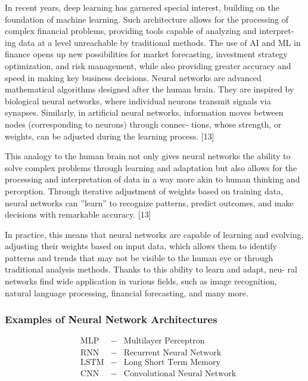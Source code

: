 \documentclass{article}
\begin{document}
\begin{flushleft}
\begin{justify}
In recent years, deep learning has garnered special interest, building on the
foundation of machine learning. Such architecture allows for the processing of
complex financial problems, providing tools capable of analyzing and interpret-
ing data at a level unreachable by traditional methods. The use of AI and ML
in finance opens up new possibilities for market forecasting, investment strategy
optimization, and risk management, while also providing greater accuracy and
speed in making key business decisions. Neural networks are advanced mathematical algorithms designed after the
human brain. They are inspired by biological neural networks, where individual
neurons transmit signals via synapses. Similarly, in artificial neural networks,
information moves between nodes (corresponding to neurons) through connec-
tions, whose strength, or weights, can be adjusted during the learning process.
[13]

This analogy to the human brain not only gives neural networks the ability
to solve complex problems through learning and adaptation but also allows for
the processing and interpretation of data in a way more akin to human thinking
and perception. Through iterative adjustment of weights based on training data,
neural networks can ”learn” to recognize patterns, predict outcomes, and make
decisions with remarkable accuracy. [13]

In practice, this means that neural networks are capable of learning and
evolving, adjusting their weights based on input data, which allows them to
identify patterns and trends that may not be visible to the human eye or through
traditional analysis methods. Thanks to this ability to learn and adapt, neu-
ral networks find wide application in various fields, such as image recognition,
natural language processing, financial forecasting, and many more.

\subsubsection{Examples of Neural Network Architectures}


\begin{align*}
& \text{MLP} & - & \text{Multilayer Perceptron} \\
& \text{RNN} & - & \text{Recurrent Neural Network} \\
& \text{LSTM} & - & \text{Long Short Term Memory} \\
& \text{CNN} & - & \text{Convolutional Neural Network}
\end{align*}



\end{justify}
\end{flushleft}
\end{document}
